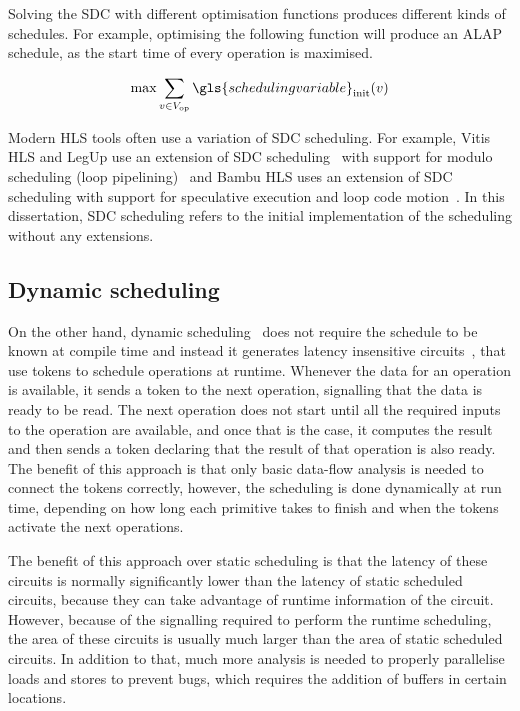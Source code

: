 Solving the \gls{SDC} with different optimisation functions produces different
kinds of schedules.  For example, optimising the following function will produce
an \gls{ALAP} schedule, as the start time of every operation is maximised.

\begin{equation}
  \mathrm{max} \sum_{v \in V_{\mathrm{op}}} \gls{scheduling variable}_{\mathrm{init}}(v)
\end{equation}

Modern \gls{HLS} tools often use a variation of \gls{SDC} scheduling.  For
example, Vitis HLS and LegUp use an extension of \gls{SDC}
scheduling~\cite[]{zhang13_sdc,canis14_modul_sdc} with support for modulo
scheduling (loop pipelining)~\cite[]{rau96_iterat_modul_sched} and Bambu HLS
uses an extension of \gls{SDC} scheduling with support for speculative execution
and loop code motion~\cite[]{lattuada15_ctbsss}.  In this dissertation,
\gls{SDC} scheduling refers to the initial implementation of the scheduling
without any extensions.

\subsection{Dynamic scheduling}%
\label{sec:bg:dynamic-scheduling}

On the other hand, \gls{dynamic
  scheduling}~\cite{josipović18_dynam_sched_high_synth} does not require the
schedule to be known at compile time and instead it generates latency
insensitive circuits~\cite{carloni01_tlid}, that use tokens to schedule
operations at runtime.  Whenever the data for an operation is available, it
sends a token to the next operation, signalling that the data is ready to be
read.  The next operation does not start until all the required inputs to the
operation are available, and once that is the case, it computes the result and
then sends a token declaring that the result of that operation is also ready.
The benefit of this approach is that only basic data-flow analysis is needed to
connect the tokens correctly, however, the scheduling is done dynamically at run
time, depending on how long each primitive takes to finish and when the tokens
activate the next operations.

The benefit of this approach over static scheduling is that the latency of these
circuits is normally significantly lower than the latency of static scheduled
circuits, because they can take advantage of runtime information of the circuit.
However, because of the signalling required to perform the runtime scheduling,
the area of these circuits is usually much larger than the area of static
scheduled circuits.  In addition to that, much more analysis is needed to
properly parallelise loads and stores to prevent bugs, which requires the
addition of buffers in certain locations.

